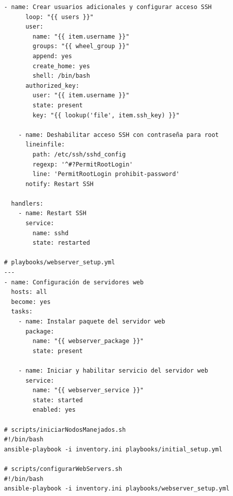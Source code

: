 \begin{lstlisting}[style=yamlstyle, caption={Solución al ejercicio de Ansible}]
    - name: Crear usuarios adicionales y configurar acceso SSH
      loop: "{{ users }}"
      user:
        name: "{{ item.username }}"
        groups: "{{ wheel_group }}"
        append: yes
        create_home: yes
        shell: /bin/bash
      authorized_key:
        user: "{{ item.username }}"
        state: present
        key: "{{ lookup('file', item.ssh_key) }}"

    - name: Deshabilitar acceso SSH con contraseña para root
      lineinfile:
        path: /etc/ssh/sshd_config
        regexp: '^#?PermitRootLogin'
        line: 'PermitRootLogin prohibit-password'
      notify: Restart SSH

  handlers:
    - name: Restart SSH
      service:
        name: sshd
        state: restarted

# playbooks/webserver_setup.yml
---
- name: Configuración de servidores web
  hosts: all
  become: yes
  tasks:
    - name: Instalar paquete del servidor web
      package:
        name: "{{ webserver_package }}"
        state: present

    - name: Iniciar y habilitar servicio del servidor web
      service:
        name: "{{ webserver_service }}"
        state: started
        enabled: yes

# scripts/iniciarNodosManejados.sh
#!/bin/bash
ansible-playbook -i inventory.ini playbooks/initial_setup.yml

# scripts/configurarWebServers.sh
#!/bin/bash
ansible-playbook -i inventory.ini playbooks/webserver_setup.yml

\end{lstlisting}


